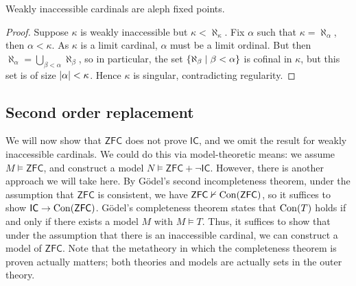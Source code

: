 \begin{proposition}
    Weakly inaccessible cardinals are aleph fixed points.
\end{proposition}
\begin{proof}
    Suppose \( \kappa \) is weakly inaccessible but \( \kappa < \aleph_\kappa \).
    Fix \( \alpha \) such that \( \kappa = \aleph_\alpha \), then \( \alpha < \kappa \).
    As \( \kappa \) is a limit cardinal, \( \alpha \) must be a limit ordinal.
    But then \( \aleph_\alpha = \bigcup_{\beta < \alpha} \aleph_\beta \), so in particular, the set \( \qty{\aleph_\beta \mid \beta < \alpha} \) is cofinal in \( \kappa \), but this set is of size \( \abs{\alpha} < \kappa \).
    Hence \( \kappa \) is singular, contradicting regularity.
\end{proof}

\subsection{Second order replacement}
We will now show that \( \mathsf{ZFC} \) does not prove \( \mathsf{IC} \), and we omit the result for weakly inaccessible cardinals.
We could do this via model-theoretic means: we assume \( M \vDash \mathsf{ZFC} \), and construct a model \( N \vDash \mathsf{ZFC} + \neg \mathsf{IC} \).
However, there is another approach we will take here.
By G\"odel's second incompleteness theorem, under the assumption that \( \mathsf{ZFC} \) is consistent, we have \( \mathsf{ZFC} \nvdash \operatorname{Con}(\mathsf{ZFC}) \), so it suffices to show \( \mathsf{IC} \to \operatorname{Con}(\mathsf{ZFC}) \).
G\"odel's completeness theorem states that \( \operatorname{Con}(T) \) holds if and only if there exists a model \( M \) with \( M \vDash T \).
Thus, it suffices to show that under the assumption that there is an inaccessible cardinal, we can construct a model of \( \mathsf{ZFC} \).
Note that the metatheory in which the completeness theorem is proven actually matters; both theories and models are actually sets in the outer theory.

